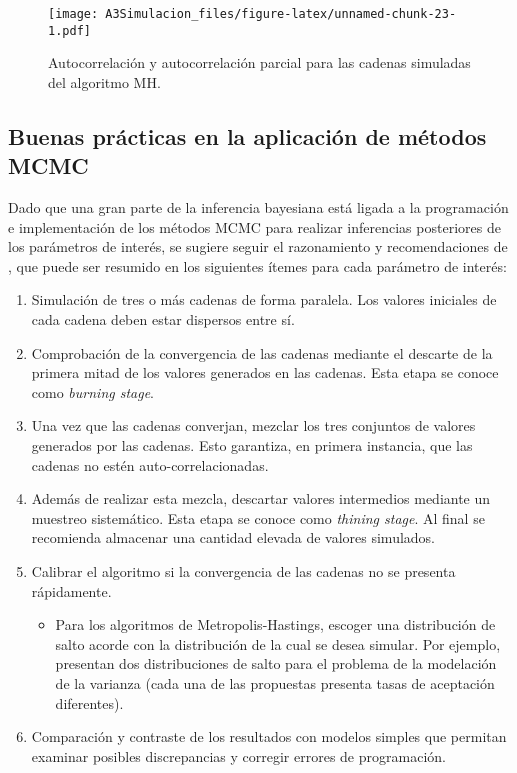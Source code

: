 \documentclass[
  12pt,
  spanish,
]{book}
\providecommand{\tightlist}{%
  \setlength{\itemsep}{0pt}\setlength{\parskip}{0pt}}
\theoremstyle{definition}
\theoremstyle{definition}
\theoremstyle{definition}
\theoremstyle{definition}
\theoremstyle{remark}
\begin{document}
\begin{figure}
\centering
\texttt{[image: A3Simulacion\_files/figure-latex/unnamed-chunk-23-1.pdf]}
\caption{\label{fig:unnamed-chunk-23}Autocorrelación y autocorrelación parcial para las cadenas simuladas del algoritmo MH.}
\end{figure}

\hypertarget{buenas-pruxe1cticas-en-la-aplicaciuxf3n-de-muxe9todos-mcmc}{%
\subsection{Buenas prácticas en la aplicación de métodos MCMC}\label{buenas-pruxe1cticas-en-la-aplicaciuxf3n-de-muxe9todos-mcmc}}

Dado que una gran parte de la inferencia bayesiana está ligada a la programación e implementación de los métodos MCMC para realizar inferencias posteriores de los parámetros de interés, se sugiere seguir el razonamiento y recomendaciones de \citet{GelShir2010}, que puede ser resumido en los siguientes ítemes para cada parámetro de interés:

\begin{enumerate}
\def\labelenumi{\arabic{enumi}.}
\tightlist
\item
  Simulación de tres o más cadenas de forma paralela. Los valores iniciales de cada cadena deben estar dispersos entre sí.
\item
  Comprobación de la convergencia de las cadenas mediante el descarte de la primera mitad de los valores generados en las cadenas. Esta etapa se conoce como \emph{burning stage}.
\item
  Una vez que las cadenas converjan, mezclar los tres conjuntos de valores generados por las cadenas. Esto garantiza, en primera instancia, que las cadenas no estén auto-correlacionadas.
\item
  Además de realizar esta mezcla, descartar valores intermedios mediante un muestreo sistemático. Esta etapa se conoce como \emph{thining stage}. Al final se recomienda almacenar una cantidad elevada de valores simulados.
\item
  Calibrar el algoritmo si la convergencia de las cadenas no se presenta rápidamente.

  \begin{itemize}
  \tightlist
  \item
    Para los algoritmos de Metropolis-Hastings, escoger una distribución de salto acorde con la distribución de la cual se desea simular. Por ejemplo, \citet{Cepe1} presentan dos distribuciones de salto para el problema de la modelación de la varianza (cada una de las propuestas presenta tasas de aceptación diferentes).
  \end{itemize}
\item
  Comparación y contraste de los resultados con modelos simples que permitan examinar posibles discrepancias y corregir errores de programación.
\end{enumerate}
\end{document}
